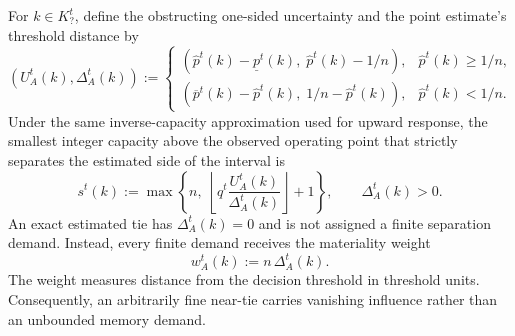 \documentclass[sigconf, nonacm]{acmart}
\begin{document}
For \(k\in K_?^t\), define the obstructing one-sided uncertainty and the point estimate's threshold distance by
\begin{equation}
\label{eq:ambiguity-sides}
(U_A^t(k),\Delta_A^t(k))
:=
\begin{cases}
\left(\hat p^t(k)-\underline p^t(k),\;
      \hat p^t(k)-1/n\right),
& \hat p^t(k)\ge 1/n,\\[1ex]
\left(\overline p^t(k)-\hat p^t(k),\;
      1/n-\hat p^t(k)\right),
& \hat p^t(k)<1/n.
\end{cases}
\end{equation}
Under the same inverse-capacity approximation used for upward response, the smallest integer capacity above the observed operating point that strictly separates the estimated side of the interval is
\begin{equation}
\label{eq:qamb-perkey}
s^t(k)
:=
\max\!\left\{
n,\;
\left\lfloor
q^t\frac{U_A^t(k)}{\Delta_A^t(k)}
\right\rfloor+1
\right\},
\qquad \Delta_A^t(k)>0.
\end{equation}
An exact estimated tie has \(\Delta_A^t(k)=0\) and is not assigned a finite separation demand. Instead, every finite demand receives the materiality weight
\begin{equation}
\label{eq:ambiguity-materiality}
w_A^t(k):=n\,\Delta_A^t(k).
\end{equation}
The weight measures distance from the decision threshold in threshold units. Consequently, an arbitrarily fine near-tie carries vanishing influence rather than an unbounded memory demand.
\end{document}
